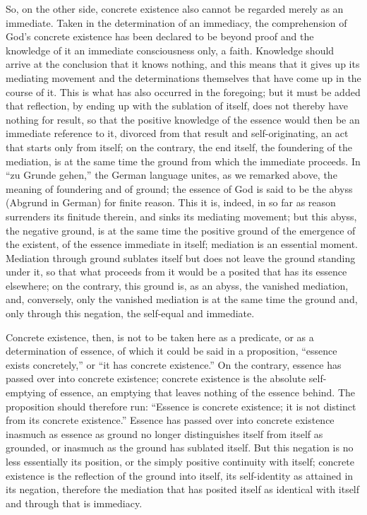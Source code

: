So, on the other side, concrete existence also
cannot be regarded merely as an immediate.
Taken in the determination of an immediacy,
the comprehension of God's concrete existence
has been declared to be beyond proof
and the knowledge of it
an immediate consciousness only, a faith.
Knowledge should arrive at
the conclusion that it knows nothing,
and this means that it gives up its mediating movement
and the determinations themselves
that have come up in the course of it.
This is what has also occurred in the foregoing;
but it must be added that reflection,
by ending up with the sublation of itself,
does not thereby have nothing for result,
so that the positive knowledge of the essence
would then be an immediate reference to it,
divorced from that result and self-originating,
an act that starts only from itself;
on the contrary, the end itself,
the foundering of the mediation,
is at the same time the ground
from which the immediate proceeds.
In “zu Grunde gehen,” the German language unites,
as we remarked above,
the meaning of foundering and of ground;
the essence of God is said to be the
abyss (Abgrund in German) for finite reason.
This it is, indeed, in so far as
reason surrenders its finitude therein,
and sinks its mediating movement;
but this abyss, the negative ground, is at the same time
the positive ground of the emergence of the existent,
of the essence immediate in itself;
mediation is an essential moment.
Mediation through ground sublates itself but
does not leave the ground standing under it,
so that what proceeds from it would be a posited
that has its essence elsewhere;
on the contrary, this ground is, as an abyss,
the vanished mediation, and, conversely, only the
vanished mediation is at the same time the ground
and, only through this negation,
the self-equal and immediate.

Concrete existence, then, is not to be taken here
as a predicate, or as a determination of essence,
of which it could be said in a proposition,
“essence exists concretely,” or “it has concrete existence.”
On the contrary, essence has passed over into concrete existence;
concrete existence is the absolute self-emptying of essence,
an emptying that leaves nothing of the essence behind.
The proposition should therefore run:
“Essence is concrete existence;
it is not distinct from its concrete existence.”
Essence has passed over into concrete existence
inasmuch as essence as ground
no longer distinguishes itself from itself as grounded,
or inasmuch as the ground has sublated itself.
But this negation is no less essentially its position,
or the simply positive continuity with itself;
concrete existence is the reflection of the ground into itself,
its self-identity as attained in its negation,
therefore the mediation that has posited itself
as identical with itself and through that is immediacy.

